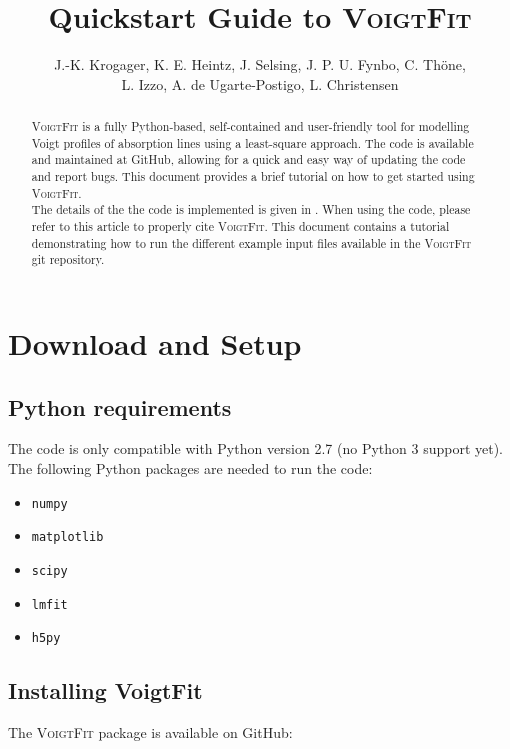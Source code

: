 \documentclass[a4paper]{article}
\title{Quickstart Guide to \textbf{\textsc{VoigtFit}}}
\author{J.-K. Krogager, K. E. Heintz, J. Selsing, J. P. U. Fynbo, C. Th{\"o}ne,\\ L. Izzo, A. de Ugarte-Postigo, L. Christensen}
\begin{document}
\maketitle

\begin{abstract}
\textsc{VoigtFit} is a fully Python-based, self-contained and user-friendly tool for modelling Voigt profiles of absorption lines using a least-square approach. The code is available and maintained at GitHub, allowing for a quick and easy way of updating the code and report bugs. This document provides a brief tutorial on how to get started using \textsc{VoigtFit}. \\

The details of the the code is implemented is given in \citet{VoigtFit}. When using the code, please refer to this article to properly cite \textsc{VoigtFit}. This document contains a tutorial demonstrating how to run the different example input files available in the \textsc{VoigtFit} git repository. 
\end{abstract}

\section{Download and Setup} \label{sec:setup}

\subsection{Python requirements}

The code is only compatible with Python version 2.7 (no Python 3 support yet). The following Python packages are needed to run the code:

\begin{itemize}[label={}]
	\setlength\itemsep{0.3em}
	\item \texttt{numpy}
	\item \texttt{matplotlib}
	\item \texttt{scipy}
	\item \texttt{lmfit}
	\item \texttt{h5py}
\end{itemize}


\subsection{Installing VoigtFit}

The \textsc{VoigtFit} package is available on GitHub:\\
\end{document}
